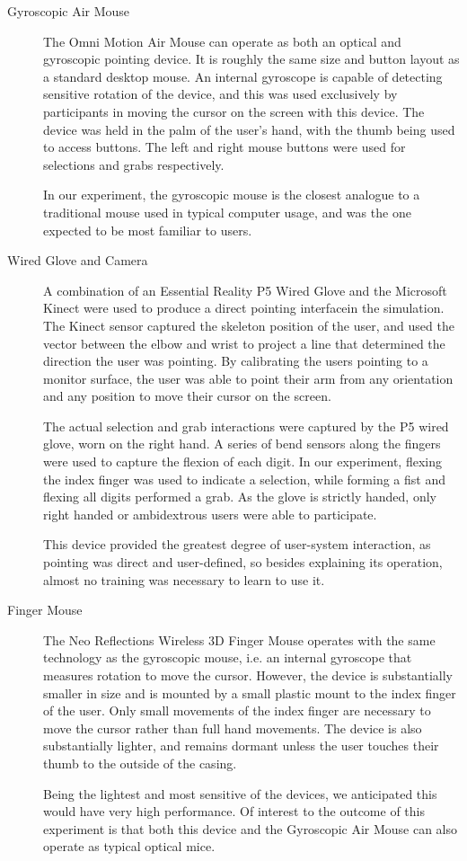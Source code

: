 \begin{description}

\item[Gyroscopic Air Mouse] The Omni Motion Air Mouse can operate as both an optical and gyroscopic pointing device. It is roughly the same size and button layout as a standard desktop mouse. An internal gyroscope is capable of detecting sensitive rotation of the device, and this was used exclusively by participants in moving the cursor on the screen with this device. The device was held in the palm of the user’s hand, with the thumb being used to access buttons. The left and right mouse buttons were used for selections and grabs respectively.

In our experiment, the gyroscopic mouse is the closest analogue to
a traditional mouse used in typical computer usage, and was the
one expected to be most familiar to users.

\item [Wired Glove and Camera] A combination of an Essential Reality P5 Wired Glove and the Microsoft Kinect were used to produce a direct pointing interfacein the simulation. The Kinect sensor captured the skeleton position of the user, and used the vector between the elbow and wrist to project a line that determined the direction the user was pointing. By calibrating the users pointing to a monitor surface, the user was able to point their arm from any orientation and any position to move their cursor on the screen.

The actual selection and grab interactions were captured by the P5 wired glove, worn on the right hand. A series of bend sensors along the fingers were used to capture the flexion of each digit. In our experiment, flexing the index finger was used to indicate a selection, while forming a fist and flexing all digits performed a grab. As the glove is strictly handed, only right handed or ambidextrous users were able to participate.

This device provided the greatest degree of user-system interaction, as pointing was direct and user-defined, so besides explaining its operation, almost no training was necessary to learn to use it.

\item [Finger Mouse] The Neo Reflections Wireless 3D Finger Mouse operates with the same technology as the gyroscopic mouse, i.e. an internal gyroscope that measures rotation to move the cursor. However, the device is substantially smaller in size and is mounted by a small plastic mount to the index finger of the user. Only small movements of the index finger are necessary to move the cursor rather than full hand movements. The device is also substantially lighter, and remains dormant unless the user touches their thumb to the outside of the casing.

Being the lightest and most sensitive of the devices, we anticipated this would have very high performance. Of interest to the outcome of this experiment is that both this device and the Gyroscopic Air Mouse can also operate as typical optical mice.

\end{description}


